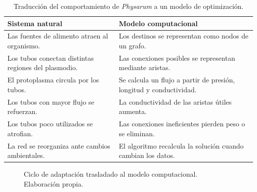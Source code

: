 \documentclass[11pt,letterpaper]{article}
\begin{document}
\begin{table}[ht]
  \centering
  \small
  \caption{Traducción del comportamiento de \emph{Physarum} a un modelo de
  optimización.}
  \label{tab:traduccion-physarum}
  \begin{tabularx}{\textwidth}{@{}>{\raggedright\arraybackslash}X
    >{\raggedright\arraybackslash}X@{}}
    \toprule
    \textbf{Sistema natural} & \textbf{Modelo computacional} \\
    \midrule
    Las fuentes de alimento atraen al organismo.
      & Los destinos se representan como nodos de un grafo. \\
    Los tubos conectan distintas regiones del plasmodio.
      & Las conexiones posibles se representan mediante aristas. \\
    El protoplasma circula por los tubos.
      & Se calcula un flujo a partir de presión, longitud y conductividad. \\
    Los tubos con mayor flujo se refuerzan.
      & La conductividad de las aristas útiles aumenta. \\
    Los tubos poco utilizados se atrofian.
      & Las conexiones ineficientes pierden peso o se eliminan. \\
    La red se reorganiza ante cambios ambientales.
      & El algoritmo recalcula la solución cuando cambian los datos. \\
    \bottomrule
  \end{tabularx}
\end{table}

\begin{figure}[ht]
  \centering
  \caption{Ciclo de adaptación trasladado al modelo computacional.
  Elaboración propia.}
  \label{fig:flujo-physarum}
\end{figure}
\end{document}
